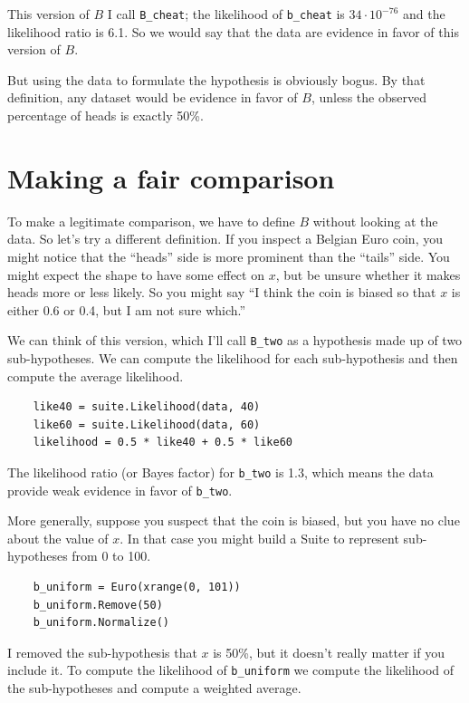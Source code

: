 \documentclass[12pt]{book}
\begin{document}
This version of $B$ I call \verb"B_cheat"; the likelihood of
\verb"b_cheat" is $34 \cdot 10^{-76}$ and the likelihood ratio is
6.1.  So we would say that the data are evidence in favor of this
version of $B$.

But using the data to formulate the hypothesis
is obviously bogus.  By that definition, any dataset would
be evidence in favor of $B$, unless the observed percentage of heads
is exactly 50\%.

\section{Making a fair comparison}

To make a legitimate comparison, we have to define $B$ without looking
at the data.  So let's try a different definition.  If you inspect
a Belgian Euro coin, you might notice that the ``heads'' side is more
prominent than the ``tails'' side.  You might expect the shape to 
have some effect on
$x$, but be unsure whether it makes heads more or less
likely.  So you might say ``I think the coin is biased so that
$x$ is either 0.6 or 0.4, but I am not sure which.''

We can think of this version, which I'll call \verb"B_two"
as a hypothesis made up of two
sub-hypotheses.  We can compute the likelihood for each
sub-hypothesis and then compute the average likelihood.

\begin{verbatim}
    like40 = suite.Likelihood(data, 40)
    like60 = suite.Likelihood(data, 60)
    likelihood = 0.5 * like40 + 0.5 * like60
\end{verbatim}

The likelihood ratio (or Bayes factor) for \verb"b_two" is 1.3, which
means the data provide weak evidence in favor of \verb"b_two".

More generally, suppose you suspect that the coin is biased,
but you have no clue about the value of $x$.  In that case you
might build a Suite to represent sub-hypotheses from 0 to 100.

\begin{verbatim}
    b_uniform = Euro(xrange(0, 101))
    b_uniform.Remove(50)
    b_uniform.Normalize()
\end{verbatim}

I removed the sub-hypothesis that $x$ is 50\%, but it doesn't
really matter if you include it.  To compute the likelihood of
\verb"b_uniform" we compute the likelihood of the sub-hypotheses
and compute a weighted average.
\end{document}
